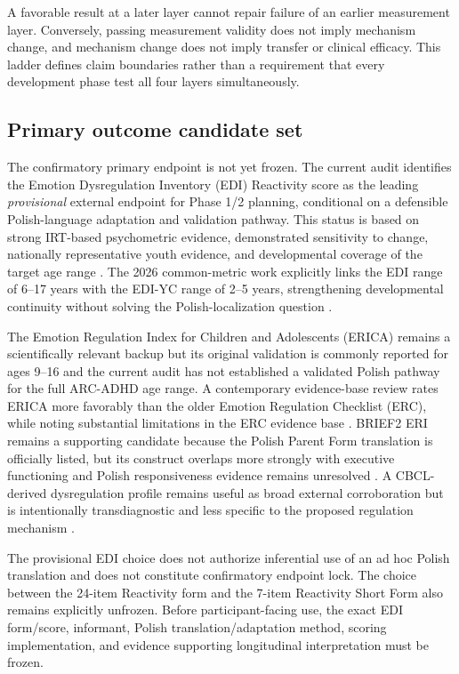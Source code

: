 A favorable result at a later layer cannot repair failure of an earlier measurement layer. Conversely, passing measurement validity does not imply mechanism change, and mechanism change does not imply transfer or clinical efficacy. This ladder defines claim boundaries rather than a requirement that every development phase test all four layers simultaneously.

\subsection{Primary outcome candidate set}

The confirmatory primary endpoint is not yet frozen. The current audit identifies the Emotion Dysregulation Inventory (EDI) Reactivity score as the leading \emph{provisional} external endpoint for Phase 1/2 planning, conditional on a defensible Polish-language adaptation and validation pathway. This status is based on strong IRT-based psychometric evidence, demonstrated sensitivity to change, nationally representative youth evidence, and developmental coverage of the target age range \parencite{mazefsky2018edi,mazefsky2021edinational,kim2026edicommon}. The 2026 common-metric work explicitly links the EDI range of 6--17 years with the EDI-YC range of 2--5 years, strengthening developmental continuity without solving the Polish-localization question \parencite{kim2026edicommon}.

The Emotion Regulation Index for Children and Adolescents (ERICA) remains a scientifically relevant backup but its original validation is commonly reported for ages 9--16 and the current audit has not established a validated Polish pathway for the full ARC-ADHD age range. A contemporary evidence-base review rates ERICA more favorably than the older Emotion Regulation Checklist (ERC), while noting substantial limitations in the ERC evidence base \parencite{mazefsky2021measures}. BRIEF2 ERI remains a supporting candidate because the Polish Parent Form translation is officially listed, but its construct overlaps more strongly with executive functioning and Polish responsiveness evidence remains unresolved \parencite{jacobson2020brief2}. A CBCL-derived dysregulation profile remains useful as broad external corroboration but is intentionally transdiagnostic and less specific to the proposed regulation mechanism \parencite{peyre2015cbcldp}.

The provisional EDI choice does not authorize inferential use of an ad hoc Polish translation and does not constitute confirmatory endpoint lock. The choice between the 24-item Reactivity form and the 7-item Reactivity Short Form also remains explicitly unfrozen. Before participant-facing use, the exact EDI form/score, informant, Polish translation/adaptation method, scoring implementation, and evidence supporting longitudinal interpretation must be frozen.

